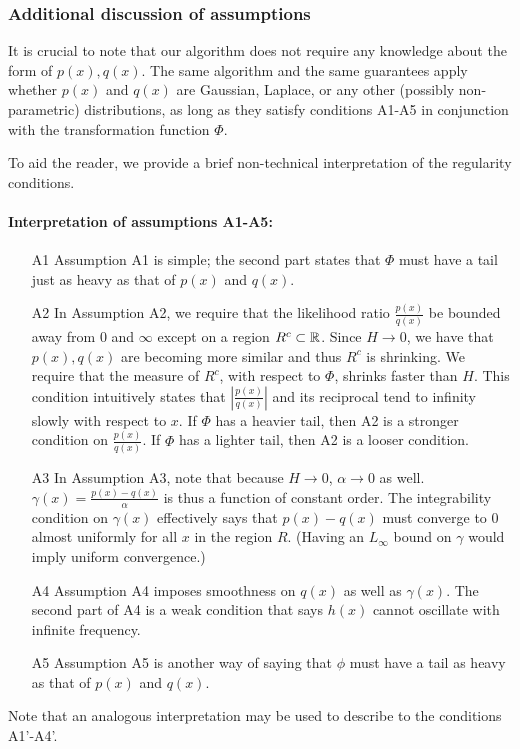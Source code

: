 \subsubsection{Additional discussion of assumptions}

It is crucial to note that our algorithm does not require any knowledge about the form of $p(x), q(x)$. The same algorithm and the same guarantees apply whether $p(x)$ and $q(x)$ are Gaussian, Laplace, or any other (possibly non-parametric) distributions, as long as they satisfy conditions A1-A5 in conjunction with the transformation function $\Phi$.

To aid the reader, we provide a brief non-technical interpretation of the regularity conditions.

\paragraph{\textbf{Interpretation of assumptions A1-A5:}}

\begin{enumerate}
\item[A1] Assumption A1 is simple; the second part states that $\Phi$ must have a tail just as heavy as that of $p(x)$ and $q(x)$. 
\item[A2] In Assumption A2, we require that the likelihood ratio $\frac{p(x)}{q(x)}$ be bounded away from 0 and $\infty$ except on a region $ R^c \subset {\mathbb R}$. Since $H \rightarrow 0$, we have that $p(x), q(x)$ are becoming more similar and thus $R^c$ is shrinking. We require that the measure of $R^c$, with respect to $\Phi$, shrinks faster than $H$. This condition intuitively states that $|\frac{p(x)}{q(x)}|$ and its reciprocal tend to infinity slowly with respect to $x$. If $\Phi$ has a heavier tail, then A2 is a stronger condition on $\frac{p(x)}{q(x)}$. If $\Phi$ has a lighter tail, then A2 is a looser condition.
\item[A3] In Assumption A3, note that because $H \rightarrow 0$, $\alpha \rightarrow 0$ as well. $\gamma(x) = \frac{p(x) - q(x)}{\alpha}$ is thus a function of constant order. The integrability condition on $\gamma(x)$ effectively says that $p(x) - q(x)$ must converge to 0 almost uniformly for all $x$ in the region $R$. (Having an $L_\infty$ bound on $\gamma$ would imply uniform convergence.) 
\item[A4]  Assumption A4 imposes smoothness on $q(x)$ as well as $\gamma(x)$. The second part of A4 is a weak condition that says $h(x)$ cannot oscillate with infinite frequency. 
\item[A5] Assumption A5 is another way of saying that $\phi$ must have a tail as heavy as that of $p(x)$ and $q(x)$. 
\end{enumerate}
Note that an analogous interpretation may be used to describe to the conditions A1'-A4'.

